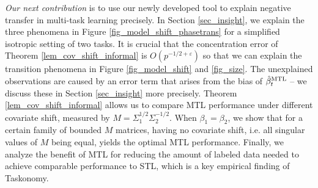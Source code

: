 \textit{Our next contribution} is to use our newly developed tool to explain negative transfer in multi-task learning precisely.
In Section \ref{sec_insight}, we explain the three phenomena in Figure \ref{fig_model_shift_phasetrans} for a simplified isotropic setting of two tasks.
It is crucial that the concentration error of Theorem \ref{lem_cov_shift_informal} is $O(p^{-1/2+\varepsilon})$ so that we can explain the transition phenomena in Figure \ref{fig_model_shift} and \ref{fig_size}.
The unexplained observations are caused by an error term that arises from the bias of $\hat{\beta}_t^{\text{MTL}}$ -- we discuss these in Section \ref{sec_insight} more precisely.
Theorem \ref{lem_cov_shift_informal} allows us to compare MTL performance under different covariate shift, measured by $M = \Sigma_1^{1/2}\Sigma_2^{-1/2}$.
When $\beta_1 = \beta_2$, we show that for a certain family of bounded $M$ matrices, having no covariate shift, i.e. all singular values of $M$ being equal, yields the optimal MTL performance.
Finally, we analyze the benefit of MTL for reducing the amount of labeled data needed to achieve comparable performance to STL, which is a key empirical finding of Taskonomy.

